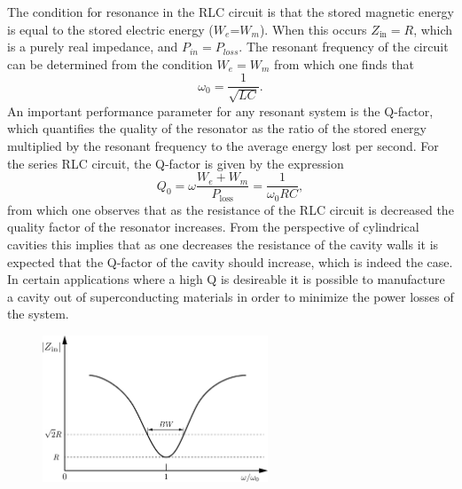 The condition for resonance in the RLC circuit is that the stored magnetic energy is equal to the stored electric energy ($W_e$=$W_m$). When this occurs $Z_\mathrm{in}=R$, which is a purely real impedance, and $P_{in}=P_{loss}$. The resonant frequency of the circuit can be determined from the condition $W_e=W_m$ from which one finds that 
\begin{equation}
    \omega_0=\frac{1}{\sqrt{LC}}.
\end{equation}
An important performance parameter for any resonant system is the Q-factor, which quantifies the quality of the resonator as the ratio of the stored energy multiplied by the resonant frequency to the average energy lost per second. For the series RLC circuit, the Q-factor is given by the expression 
\begin{equation}
    Q_0=\omega\frac{W_e+W_m}{P_\mathrm{loss}}=\frac{1}{\omega_0RC},
\end{equation}
from which one observes that as the resistance of the RLC circuit is decreased the quality factor of the resonator increases. From the perspective of cylindrical cavities this implies that as one decreases the resistance of the cavity walls it is expected that the Q-factor of the cavity should increase, which is indeed the case. In certain applications where a high Q is desireable it is possible to manufacture a cavity out of superconducting materials in order to minimize the power losses of the system.

\begin{figure}[htbp]
    \centering
    \includegraphics*[width=0.6\textwidth]{figs/Chapter-6/230607_rlc_resonance.png}
    \caption{\label{fig:chap6-rlc-resonance}}
\end{figure}

